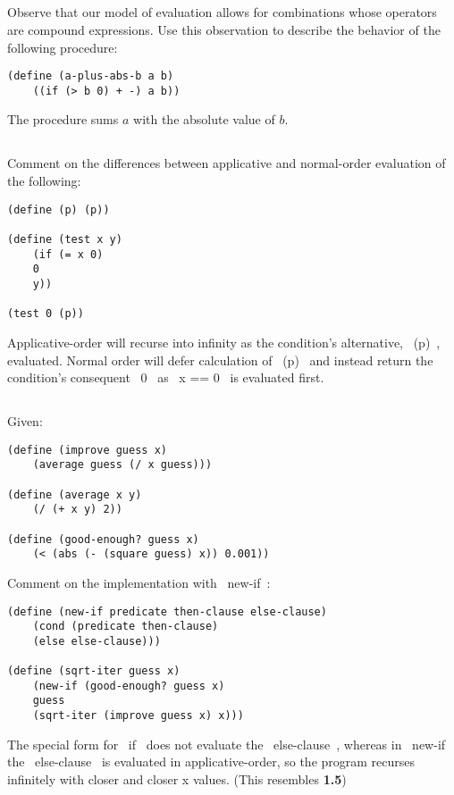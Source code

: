 \documentclass{article}
\begin{document}
\pagebreak
\subsection{}
Observe that our model of evaluation allows for combinations whose operators are compound expressions. Use this observation to describe the behavior of the following procedure:
\begin{lstlisting}
(define (a-plus-abs-b a b)
    ((if (> b 0) + -) a b))
\end{lstlisting}
The procedure sums $a$ with the absolute value of $b$.

\subsection{}
Comment on the differences between applicative and normal-order evaluation of the following:
\begin{lstlisting}
(define (p) (p))

(define (test x y)
    (if (= x 0)
    0
    y))

(test 0 (p))
\end{lstlisting}
Applicative-order will recurse into infinity as the condition's alternative, ~(p)~, evaluated. Normal order will defer calculation of ~(p)~ and instead return the condition's consequent ~0~ as ~x == 0~ is evaluated first.

\subsection{}
Given:
\begin{lstlisting}
(define (improve guess x)
    (average guess (/ x guess)))

(define (average x y)
    (/ (+ x y) 2))

(define (good-enough? guess x)
    (< (abs (- (square guess) x)) 0.001))
\end{lstlisting}
Comment on the implementation with ~new-if~:
\begin{lstlisting}
(define (new-if predicate then-clause else-clause)
    (cond (predicate then-clause)
    (else else-clause)))

(define (sqrt-iter guess x)
    (new-if (good-enough? guess x)
    guess
    (sqrt-iter (improve guess x) x)))
\end{lstlisting}
The special form for ~if~ does not evaluate the ~else-clause~, whereas in ~new-if~ the ~else-clause~ is evaluated in applicative-order, so the program recurses infinitely with closer and closer x values. (This resembles \textbf{1.5})
\end{document}
